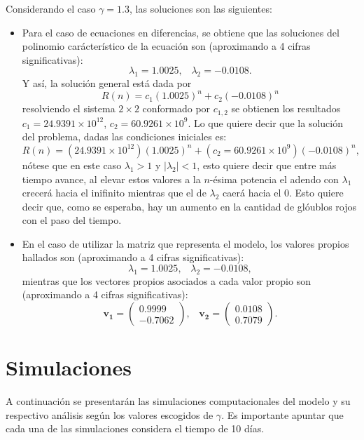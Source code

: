 Considerando el caso $\gamma = 1.3$, las soluciones son las siguientes:
\begin{itemize}
    \item Para el caso de ecuaciones en diferencias, se obtiene que las soluciones del polinomio carácterístico de la ecuación son (aproximando a 4 cifras significativas):
        $$\lambda_1 = 1.0025,\;\;\; \lambda_2 = -0.0108.$$
        Y así, la solución general está dada por 
        $$R(n)=c_1(1.0025)^n+c_2(-0.0108)^n$$
        resolviendo el sistema $2\times 2$ conformado por $c_{1,2}$ se obtienen los resultados $c_1=24.9391\times 10^{12}$, $c_2 = 60.9261\times 10^{9}$. Lo que quiere decir que la solución del problema, dadas las condiciones iniciales es:
        $$R(n)=(24.9391\times 10^{12})(1.0025)^n+(c_2 = 60.9261\times 10^{9})(-0.0108)^n,$$
        nótese que en este caso $\lambda_1>1$ y $|\lambda_2|<1$, esto quiere decir que entre más tiempo avance, al elevar estos valores a la $n$-ésima potencia el adendo con $\lambda_1$ crecerá hacia el inifinito mientras que el de $\lambda_2$ caerá hacia el 0. Esto quiere decir que, como se esperaba, hay un aumento en la cantidad de glóublos rojos con el paso del tiempo.
    \item En el caso de utilizar la matriz que representa el modelo, los valores propios hallados son (aproximando a 4 cifras significativas):
        $$\lambda_1 = 1.0025, \;\;\; \lambda_2 = -0.0108,$$
        mientras que los vectores propios asociados a cada valor propio son (aproximando a 4 cifras significativas):
        $$\mathbf{v_1}=\begin{pmatrix}
            0.9999  \\ 
            -0.7062
            \end{pmatrix},\;\;\;  \mathbf{v_2}=\begin{pmatrix}
            0.0108  \\
            0.7079
            \end{pmatrix}.$$

\end{itemize}

\section{Simulaciones}\label{sec:modelo:simulaciones}
A continuación se presentarán las simulaciones computacionales del modelo y su respectivo análisis según los valores escogidos de $\gamma$. Es importante apuntar que cada una de las simulaciones considera el tiempo de 10 días.

